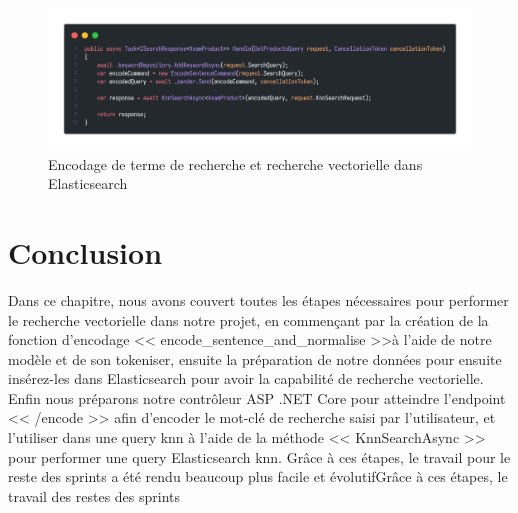 \begin{figure}[H]
	\centering
	\includegraphics[width=1\textwidth]{logos/returnencodedvector.png}
	\caption{Encodage de terme de recherche et recherche vectorielle dans Elasticsearch}
	\label{fig:returnencodedvector}
\end{figure}


\newpage
\section{Conclusion}
\noindent
Dans ce chapitre, nous avons couvert toutes les étapes nécessaires pour performer le recherche vectorielle dans notre projet, en commençant par la création de la fonction d'encodage << encode\_sentence\_and\_normalise >>à l'aide de notre modèle et de son tokeniser, ensuite la préparation de notre données pour ensuite insérez-les dans Elasticsearch pour avoir la capabilité de recherche vectorielle. Enfin nous préparons notre contrôleur ASP .NET Core pour atteindre l'endpoint << /encode >> afin d'encoder le mot-clé de recherche saisi par l'utilisateur, et l'utiliser dans une query knn à l'aide de la méthode << KnnSearchAsync >> pour performer une query Elasticsearch knn.
Grâce à ces étapes, le travail pour le reste des sprints a été rendu beaucoup plus facile et évolutifGrâce à ces étapes, le travail des restes des sprints